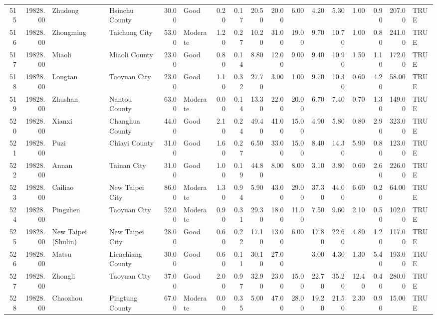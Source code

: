 \begin{table}[ht]
\begin{tabular}{rrllrlrrrrrrrrrrl}
  515 & 19828.00 & Zhudong & Hsinchu County & 30.00 & Good & 0.20 & 0.17 & 20.50 & 20.00 & 6.00 & 4.20 & 5.30 & 1.00 & 0.90 & 207.00 & TRUE \\ 
  516 & 19828.00 & Zhongming & Taichung City & 53.00 & Moderate & 1.20 & 0.27 & 10.20 & 31.00 & 19.00 & 9.70 & 10.70 & 1.00 & 0.80 & 241.00 & TRUE \\ 
  517 & 19828.00 & Miaoli & Miaoli County & 23.00 & Good & 0.80 & 0.14 & 8.80 & 12.00 & 9.00 & 9.40 & 10.90 & 1.50 & 1.10 & 172.00 & TRUE \\ 
  518 & 19828.00 & Longtan & Taoyuan City & 23.00 & Good & 1.10 & 0.32 & 27.70 & 3.00 & 1.00 & 9.70 & 10.30 & 0.60 & 4.20 & 58.00 & TRUE \\ 
  519 & 19828.00 & Zhushan & Nantou County & 63.00 & Moderate & 0.00 & 0.14 & 13.30 & 22.00 & 20.00 & 6.70 & 7.40 & 0.70 & 1.30 & 149.00 & TRUE \\ 
  520 & 19828.00 & Xianxi & Changhua County & 44.00 & Good & 2.10 & 0.24 & 49.40 & 41.00 & 15.00 & 4.90 & 5.80 & 0.80 & 2.90 & 323.00 & TRUE \\ 
  521 & 19828.00 & Puzi & Chiayi County & 31.00 & Good & 1.60 & 0.27 & 6.50 & 33.00 & 15.00 & 8.40 & 14.30 & 5.90 & 0.80 & 123.00 & TRUE \\ 
  522 & 19828.00 & Annan & Tainan City & 31.00 & Good & 1.00 & 0.19 & 44.80 & 8.00 & 8.00 & 3.10 & 3.80 & 0.60 & 2.60 & 226.00 & TRUE \\ 
  523 & 19828.00 & Cailiao & New Taipei City & 86.00 & Moderate & 1.30 & 0.94 & 5.90 & 43.00 & 29.00 & 37.30 & 44.00 & 6.60 & 0.20 & 64.00 & TRUE \\ 
  524 & 19828.00 & Pingzhen & Taoyuan City & 52.00 & Moderate & 0.90 & 0.31 & 29.30 & 18.00 & 11.00 & 7.50 & 9.60 & 2.10 & 0.50 & 102.00 & TRUE \\ 
  525 & 19828.00 & New Taipei (Shulin) & New Taipei City & 28.00 & Good & 0.60 & 0.22 & 17.10 & 13.00 & 6.00 & 17.80 & 22.60 & 4.80 & 1.20 & 117.00 & TRUE \\ 
  526 & 19828.00 & Matsu & Lienchiang County & 30.00 & Good & 0.60 & 0.11 & 30.10 & 27.00 &  & 3.00 & 4.30 & 1.30 & 5.40 & 193.00 & TRUE \\ 
  527 & 19828.00 & Zhongli & Taoyuan City & 37.00 & Good & 2.00 & 0.97 & 32.90 & 23.00 & 15.00 & 22.70 & 35.20 & 12.40 & 0.40 & 280.00 & TRUE \\ 
  528 & 19828.00 & Chaozhou & Pingtung County & 67.00 & Moderate & 0.00 & 0.35 & 5.00 & 47.00 & 28.00 & 19.20 & 21.50 & 2.30 & 0.90 & 15.00 & TRUE \\ 

\end{tabular}
\end{table}
